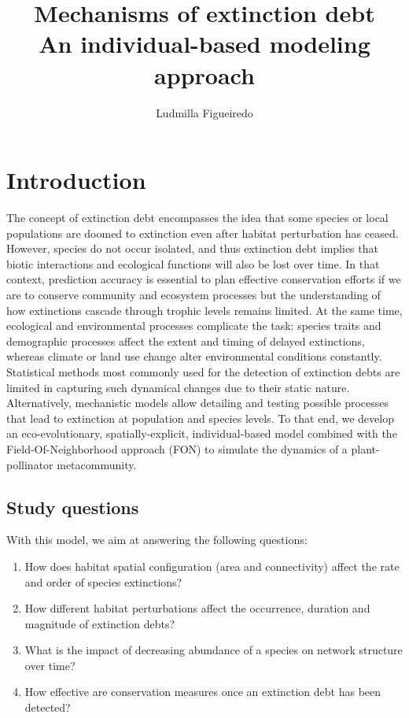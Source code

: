 \documentclass[11pt, a4paper]{article}
\title{\textbf{Mechanisms of extinction debt}\\
  \large An individual-based modeling approach}
\author{Ludmilla Figueiredo}
\begin{document}
\maketitle
\section{Introduction}
The concept of extinction debt encompasses the idea that some species or local populations are doomed to extinction even after habitat perturbation has ceased. However, species do not occur isolated, and thus extinction debt implies that biotic interactions and ecological functions will also be lost over time. In that context, prediction accuracy is essential to plan effective conservation efforts if we are to conserve community and ecosystem processes but the understanding of how extinctions cascade through trophic levels remains limited. At the same time, ecological and environmental processes complicate the task: species traits and demographic processes affect the extent and timing of delayed extinctions, whereas climate or land use change alter environmental conditions constantly. Statistical methods most commonly used for the detection of extinction debts are limited in capturing such dynamical changes due to their static nature. Alternatively, mechanistic models allow detailing and testing possible processes that lead to extinction at population and species levels. To that end, we develop an eco-evolutionary, spatially-explicit, individual-based model combined with the Field-Of-Neighborhood approach (FON) to simulate the dynamics of a plant-pollinator metacommunity.
\subsection{Study questions}
With this model, we aim at answering the following questions:
\begin{enumerate}
\item How does habitat spatial configuration (area and connectivity) affect the rate and order of species extinctions?
\item How different habitat perturbations affect the occurrence, duration and magnitude of extinction debts?
\item What is the impact of decreasing abundance of a species on network structure over time?
\item How effective are conservation measures once an extinction debt has been detected?
\end{enumerate}
\end{document}
